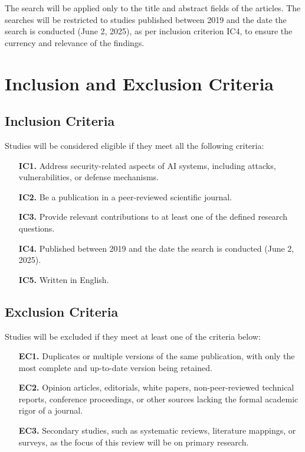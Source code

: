 \documentclass[twoside,brazilian,english]{UNISINOSmonografia}
\begin{document}
The search will be applied only to the title and abstract fields of the articles. The searches will be restricted to studies published between 2019 and the date the search is conducted (June 2, 2025), as per inclusion criterion IC4, to ensure the currency and relevance of the findings.

\section{Inclusion and Exclusion Criteria}

\subsection{Inclusion Criteria}
Studies will be considered eligible if they meet all the following criteria:
\begin{itemize}
    \item[\textbf{IC1.}] Address security-related aspects of AI systems, including attacks, vulnerabilities, or defense mechanisms.
    \item[\textbf{IC2.}] Be a publication in a peer-reviewed scientific journal.
    \item[\textbf{IC3.}] Provide relevant contributions to at least one of the defined research questions.
    \item[\textbf{IC4.}] Published between 2019 and the date the search is conducted (June 2, 2025).
    \item[\textbf{IC5.}] Written in English.
\end{itemize}

\subsection{Exclusion Criteria}
Studies will be excluded if they meet at least one of the criteria below:
\begin{itemize}
    \item[\textbf{EC1.}] Duplicates or multiple versions of the same publication, with only the most complete and up-to-date version being retained.
    \item[\textbf{EC2.}] Opinion articles, editorials, white papers, non-peer-reviewed technical reports, conference proceedings, or other sources lacking the formal academic rigor of a journal.
    \item[\textbf{EC3.}] Secondary studies, such as systematic reviews, literature mappings, or surveys, as the focus of this review will be on primary research.
\end{itemize}
\end{document}
